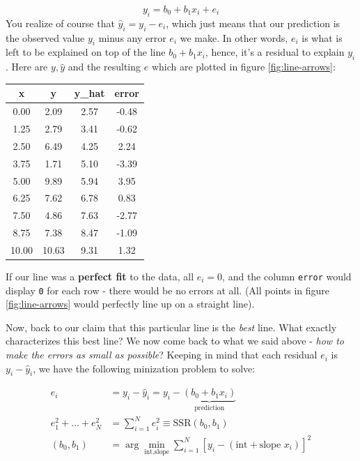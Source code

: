 \documentclass[]{book}
\theoremstyle{definition}
\theoremstyle{definition}
\theoremstyle{definition}
\theoremstyle{remark}
\begin{document}
\[
y_i = b_0 + b_1 x_i + e_i \label{eq:abline}
\] You realize of course that \(\hat{y}_i = y_i - e_i\), which just
means that our prediction is the observed value \(y_i\) minus any error
\(e_i\) we make. In other words, \(e_i\) is what is left to be explained
on top of the line \(b_0 + b_1 x_i\), hence, it's a residual to explain
\(y_i\). Here are \(y,\hat{y}\) and the resulting \(e\) which are
plotted in figure \ref{fig:line-arrows}:

\begin{tabular}{c|c|c|c}
\hline
x & y & y\_hat & error\\
\hline
0.00 & 2.09 & 2.57 & -0.48\\
\hline
1.25 & 2.79 & 3.41 & -0.62\\
\hline
2.50 & 6.49 & 4.25 & 2.24\\
\hline
3.75 & 1.71 & 5.10 & -3.39\\
\hline
5.00 & 9.89 & 5.94 & 3.95\\
\hline
6.25 & 7.62 & 6.78 & 0.83\\
\hline
7.50 & 4.86 & 7.63 & -2.77\\
\hline
8.75 & 7.38 & 8.47 & -1.09\\
\hline
10.00 & 10.63 & 9.31 & 1.32\\
\hline
\end{tabular}

If our line was a \textbf{perfect fit} to the data, all \(e_i = 0\), and
the column \texttt{error} would display \texttt{0} for each row - there
would be no errors at all. (All points in figure \ref{fig:line-arrows}
would perfectly line up on a straight line).

Now, back to our claim that this particular line is the \emph{best}
line. What exactly characterizes this best line? We now come back to
what we said above - \emph{how to make the errors as small as possible}?
Keeping in mind that each residual \(e_i\) is \(y_i - \hat{y}_i\), we
have the following minization problem to solve:

\begin{align}
e_i & = y_i - \hat{y}_i = y_i - \underbrace{\left(b_0 + b_1 x_i\right)}_\text{prediction}\\
e_1^2 + \dots + e_N^2 &= \sum_{i=1}^N e_i^2 \equiv \text{SSR}(b_0,b_1) \\
(b_0,b_1) &= \arg \min_{\text{int},\text{slope}} \sum_{i=1}^N \left[y_i - \left(\text{int} + \text{slope } x_i\right)\right]^2 \label{eq:ols-min}
\end{align}
\end{document}
